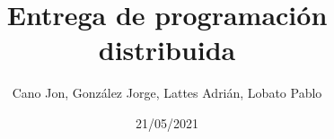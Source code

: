 \documentclass[10pt,a4paper]{article}
\author{Cano Jon, González Jorge, Lattes Adrián, Lobato Pablo}
\title{Entrega de programación distribuida}
\date{21/05/2021}
\begin{document}
	\tableofcontents
	
	\lstlistoflistings
	\newpage
\end{document}
